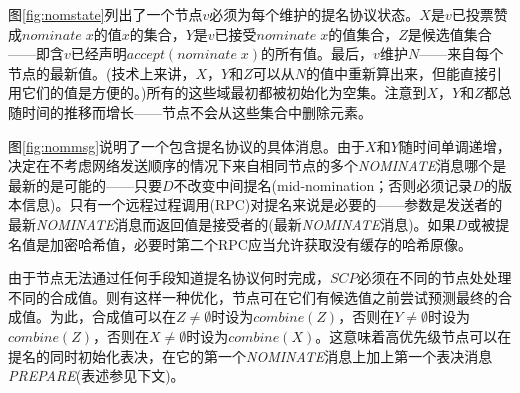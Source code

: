 {图\ref{fig:nomstate}}列出了一个节点$v$必须为每个{\slot}维护的提名协议状态。$X$是$v$已投票赞成$nominate\;x$的值$x$的集合，$Y$是$v$已接受$nominate\;x$的值集合，$Z$是候选值集合——即含$v${\quorum}已经声明$accept(nominate\;x)$的所有值。最后，$v$维护$N$——来自每个节点的最新值。(技术上来讲，$X$，$Y$和$Z$可以从$N$的值中重新算出来，但能直接引用它们的值是方便的。)所有的这些域最初都被初始化为空集。注意到$X$，$Y$和$Z$都总随时间的推移而增长——节点不会从这些集合中删除元素。

{图\ref{fig:nommsg}}说明了一个包含提名协议的具体消息。由于$X$和$Y$随时间单调递增，决定在不考虑网络发送顺序的情况下来自相同节点的多个\textsl{NOMINATE}消息哪个是最新的是可能的——只要$D$不改变中间提名(mid-nomination；否则必须记录$D$的版本信息)。只有一个远程过程调用(RPC)对提名来说是必要的——参数是发送者的最新\textsl{NOMINATE}消息而返回值是接受者的(最新\textsl{NOMINATE}消息{})。如果$D$或被提名值是加密哈希值，必要时第二个RPC应当允许获取没有缓存的哈希原像。

由于节点无法通过任何手段知道提名协议何时完成，$SCP$必须在不同的节点处处理不同的合成值。则有这样一种优化，节点可在它们有候选值之前尝试预测最终的合成值。为此，合成值可以在$Z\neq \emptyset$时设为$combine(Z)$，否则在$Y\neq \emptyset$时设为$combine(Z)$，否则在$X\neq \emptyset$时设为$combine(X)$。这意味着高优先级节点可以在提名的同时初始化表决，在它的第一个\textsl{NOMINATE}消息上加上第一个表决消息\textsl{PREPARE}(表述参见下文)。